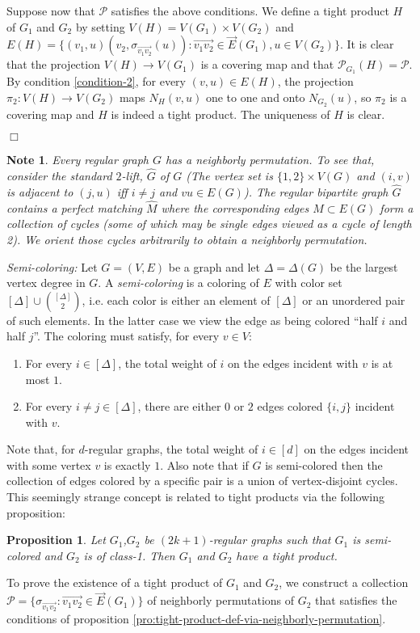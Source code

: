 \documentclass[12pt]{article}
\newtheorem{note}[theorem]{Note}
\newtheorem{proposition}[theorem]{Proposition}
\newtheorem{open question}[theorem]{Open question}
\newcommand{\proof}{{\par\noindent {\bf Proof}\space\space}}
\newcommand{\proofbox}{\begin{flushright}$\Box$\end{flushright}}
\begin{document}
Suppose now that $\mathscr{P}$ satisfies the above conditions. We define a tight product $H$ of $G_1$ and $G_2$ by setting $V(H)=V(G_1)\times V(G_2)$ and $E(H)=\{(v_1,u)(v_2,\sigma_{\overrightarrow{v_1v_2}}(u)):\overrightarrow{v_1v_2}\in \vec E(G_1), u\in V(G_2)\}$. It is clear that the projection $V(H)\rightarrow V(G_1)$ is a covering map and that $\mathscr{P}_{G_1}(H)=\mathscr{P}$. By condition \ref{condition-2}, for every $(v,u)\in E(H)$, the projection $\pi_2:V(H)\rightarrow V(G_2)$ maps $N_H(v,u)$ one to one and onto $N_{G_2}(u)$, so $\pi_2$ is a covering map and $H$ is indeed a tight product. The uniqueness of $H$ is clear.
\proofbox
\begin{note} Every regular graph $G$ has a neighborly permutation. To see that, consider the standard $2$-lift, $\hat{G}$ of $G$ (The vertex set is $\{1,2\}\times V(G)$ and $(i,v)$ is adjacent to $(j,u)$ iff $i\ne j$ and $vu\in E(G)$). The regular bipartite graph $\hat{G}$ contains a perfect matching $\hat{M}$ where the corresponding edges $M\subset E(G)$ form a collection of cycles (some of which may be single edges viewed as a cycle of length 2). We orient those cycles arbitrarily to obtain a neighborly permutation.
\end{note}

{\em Semi-coloring:} Let $G=(V,E)$ be a graph and let $\Delta=\Delta(G)$ be the largest vertex degree in $G$. A {\em semi-coloring} is a coloring of $E$ with color set $[\Delta]\cup {[\Delta]\choose 2}$, i.e. each color is either an element of $[\Delta]$ or an
unordered pair of such elements. In the latter case we view the edge as being colored ``half $i$ and half $j$''. The coloring must satisfy, for every $v\in V$:
\begin{enumerate}
\item For every $i\in [\Delta]$, the total weight of $i$ on the edges incident with $v$ is at most $1$.
\item For every $i\ne j\in [\Delta]$, there are either $0$ or $2$ edges colored $\{i,j\}$ incident with $v$.
\end{enumerate}
Note that, for $d$-regular graphs, the total weight of $i\in [d]$ on the edges incident with some vertex $v$ is exactly $1$. Also note that if $G$ is semi-colored then the collection of edges colored by a specific pair is a union of vertex-disjoint cycles.\\
This seemingly strange concept is related to tight products via the following proposition:
\begin{proposition}\label{pro:semi-coloring}
Let $G_1$,$G_2$ be $(2k+1)$-regular graphs such that $G_1$ is semi-colored and $G_2$ is of class-1. Then $G_1$ and $G_2$ have a tight product.
\end{proposition}
\proof
To prove the existence of a tight product of $G_1$ and $G_2$, we construct a collection $\mathscr{P}=\{\sigma_{\overrightarrow{v_1v_2}}:\overrightarrow{v_1v_2}\in \vec E(G_1)\}$ of neighborly permutations of $G_2$ that satisfies the conditions of proposition \ref{pro:tight-product-def-via-neighborly-permutation}.
\end{document}
